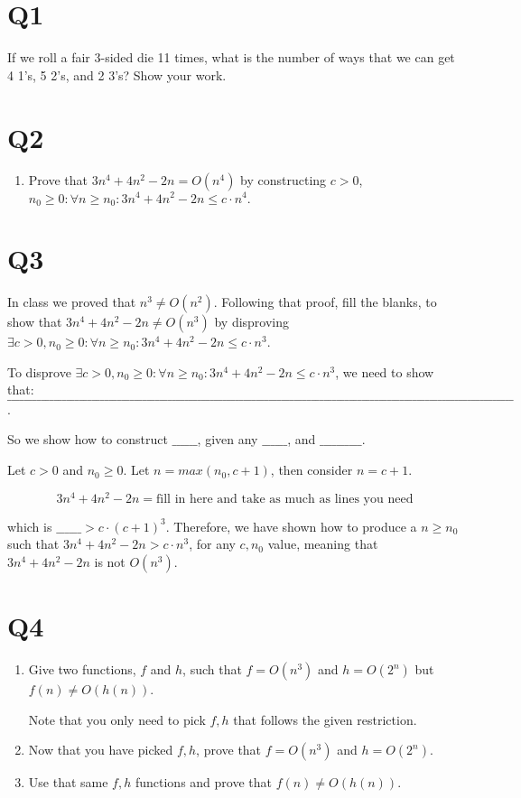 \documentclass[12pt]{exam}
\begin{document}
\section{Q1}
If we roll a fair 3-sided die 11 times, what is the number of ways that we can get 4 1’s, 5 2’s, and 2 3’s? Show your work.

\section{Q2}


\begin{enumerate}
    \item Prove that $3n^4 + 4n^2 - 2n = O(n^4)$ by constructing $c > 0$, $n_0 \geq 0 : \forall n \geq n_0 : 3n^4 + 4n^2 - 2n \leq c \cdot n^4.$
\end{enumerate}

\section{Q3}
In class we proved that $n^3 \neq O(n^2)$. Following that proof, fill the blanks, to show that $3n^4 + 4n^2 -2n \neq O(n^3)$ by disproving $\exists c > 0, n_0 \geq 0 : \forall n \geq n_0 : 3n^4 + 4n^2 -2n \leq c \cdot n^3$.

To disprove $\exists c > 0, n_0 \geq 0 : \forall n \geq n_0 : 3n^4 + 4n^2 -2n \leq c \cdot n^3$, we need to show that: $\_\_\_\_\_\_\_\_\_\_\_\_\_\_\_\_\_\_\_\_\_\_\_\_\_\_\_\_\_\_\_\_\_\_\_\_\_\_\_\_\_\_\_\_\_\_\_\_\_\_\_\_\_\_\_\_\_\_\_\_\_\_\_\_\_\_\_\_\_\_\_\_\_\_\_\_\_\_\_\_\_\_\_\_\_\_\_\_\_\_\_\_\_\_\_\_\_\_\_\_\_\_\_\_\_\_\_\_\_\_\_\_\_\_\_\_\_\_\_\_$.

So we show how to construct $\_\_\_\_\_\_$, given any $\_\_\_\_\_\_$, and $\_\_\_\_\_\_\_\_\_\_$.

Let $c > 0$ and $n_0 \geq 0$. Let $n = max(n_0, c + 1)$, then consider $n = c + 1$.

\[3n^4 + 4n^2 -2n = \text{fill in here and take as much as lines you need}\]


which is $\_\_\_\_\_\_ > c \cdot (c + 1)^3$. Therefore, we have shown how to produce a $n \geq n_0$ such that $3n^4 + 4n^2 -2n > c \cdot n^3$, for any $c, n_0$ value, meaning that $3n^4 + 4n^2 -2n$ is not $O(n^3)$.



\section{Q4}
\begin{enumerate}
    \item Give two functions, $f$ and $h$, such that $f = O(n^3)$ and $h = O(2^n)$ but $f(n)  \neq O(h(n))$.

    Note that you only need to pick $f,h$ that follows the given restriction.
    \item Now that you have picked $f,h$, prove that $f = O(n^3)$ and $h = O(2^n)$.

    \item Use that same $f,h$ functions and prove that $f(n) \neq O(h(n))$.
\end{enumerate}
\end{document}
